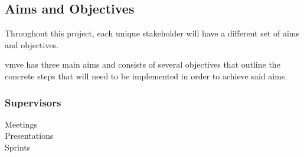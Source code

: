 \documentclass[11pt]{article}
\begin{document}
\subsection{Aims and Objectives}
Throughout this project, each unique stakeholder will have a different set of
aims and objectives. 

\gls*{vmve} has three main aims and consists of several objectives that outline
the concrete steps that will need to be implemented in order to achieve said
aims.

\subsubsection{Supervisors}

\begin{description}
  \item[Meetings] 
  \item[Presentations] 
  \item[Sprints] 
\end{description}
\end{document}
